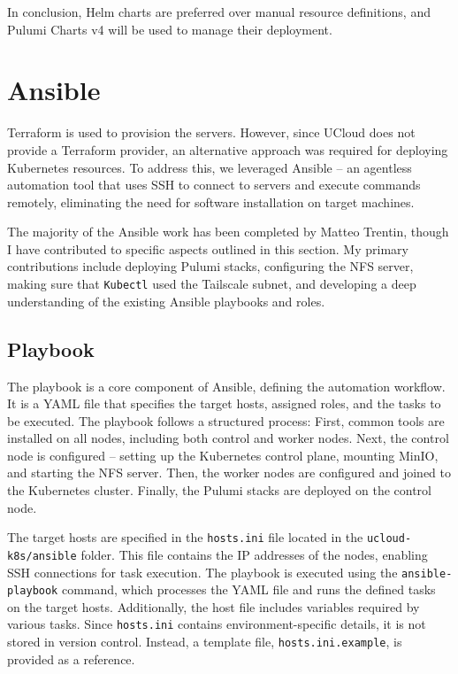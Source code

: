 In conclusion, Helm charts are preferred over manual resource definitions, and Pulumi Charts v4 will be used to manage their deployment.

\section{Ansible}
Terraform is used to provision the servers. However, since UCloud does not provide a Terraform provider, an alternative approach was required for deploying Kubernetes resources. To address this, we leveraged Ansible -- an agentless automation tool that uses SSH to connect to servers and execute commands remotely, eliminating the need for software installation on target machines.

The majority of the Ansible work has been completed by Matteo Trentin, though I have contributed to specific aspects outlined in this section. My primary contributions include deploying Pulumi stacks, configuring the NFS server, making sure that \texttt{Kubectl} used the Tailscale subnet, and developing a deep understanding of the existing Ansible playbooks and roles.

\subsection{Playbook}
The playbook is a core component of Ansible, defining the automation workflow. It is a YAML file that specifies the target hosts, assigned roles, and the tasks to be executed. The playbook follows a structured process: First, common tools are installed on all nodes, including both control and worker nodes. Next, the control node is configured -- setting up the Kubernetes control plane, mounting MinIO, and starting the NFS server. Then, the worker nodes are configured and joined to the Kubernetes cluster. Finally, the Pulumi stacks are deployed on the control node.

The target hosts are specified in the \texttt{hosts.ini} file located in the \texttt{ucloud-k8s/\allowbreak ansible} folder. This file contains the IP addresses of the nodes, enabling SSH connections for task execution. The playbook is executed using the \texttt{ansible-playbook} command, which processes the YAML file and runs the defined tasks on the target hosts. Additionally, the host file includes variables required by various tasks. Since \texttt{hosts.ini} contains environment-specific details, it is not stored in version control. Instead, a template file, \texttt{hosts.ini.example}, is provided as a reference.

